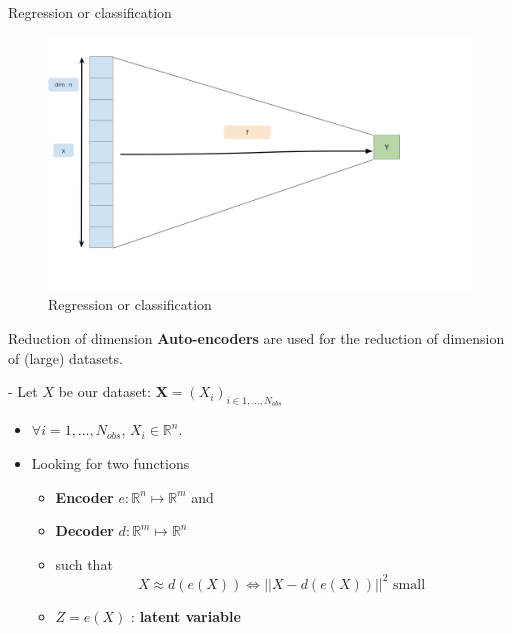 \documentclass[
  ignorenonframetext,
]{beamer}
\begin{document}
\begin{frame}{Regression or classification}
\protect\hypertarget{regression-or-classification-1}{}
\begin{figure}

{\centering \includegraphics[width=0.9\linewidth]{images/RegressionClassification} 

}

\caption{Regression or classification}\label{fig:unnamed-chunk-1}
\end{figure}
\end{frame}

\begin{frame}{Reduction of dimension}
\protect\hypertarget{reduction-of-dimension}{}
\textbf{Auto-encoders} are used for the reduction of dimension of
(large) datasets.

- Let \(X\) be our dataset:
\(\mathbf{X}=(X_i)_{i \in 1, \dots,N_{obs}}\)

\begin{itemize}
\item
  \(\forall i =1,\dots,N_{obs}\), \(X_i \in \mathbb{R}^n\).
\item
  Looking for two functions

  \begin{itemize}
  \item
    \textbf{Encoder} \(e :\mathbb{R}^n \mapsto \mathbb{R}^m\) and
  \item
    \textbf{Decoder} \(d :\mathbb{R}^m \mapsto \mathbb{R}^n\)
  \item
    such that
    \[X \approx d(e(X)) \Leftrightarrow ||X -   d(e(X)) ||^2 \mbox{ small } \]
  \item
    \(Z = e(X)\) : \textbf{latent variable}
  \end{itemize}
\end{itemize}
\end{frame}
\end{document}
